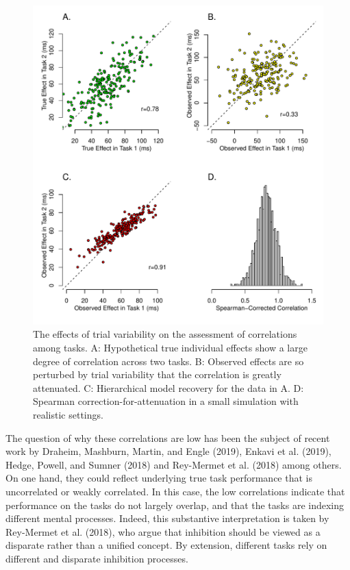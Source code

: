 \documentclass[
  ,man]{apa6}
\begin{document}
\begin{figure}
\centering
\includegraphics{p_files/figure-latex/example-1.pdf}
\caption{\label{fig:example}The effects of trial variability on the assessment of correlations among tasks. A: Hypothetical true individual effects show a large degree of correlation across two tasks. B: Observed effects are so perturbed by trial variability that the correlation is greatly attenuated. C: Hierarchical model recovery for the data in A. D: Spearman correction-for-attenuation in a small simulation with realistic settings.}
\end{figure}

The question of why these correlations are low has been the subject of recent work by Draheim, Mashburn, Martin, and Engle (2019), Enkavi et al. (2019), Hedge, Powell, and Sumner (2018) and Rey-Mermet et al. (2018) among others. On one hand, they could reflect underlying true task performance that is uncorrelated or weakly correlated. In this case, the low correlations indicate that performance on the tasks do not largely overlap, and that the tasks are indexing different mental processes. Indeed, this substantive interpretation is taken by Rey-Mermet et al. (2018), who argue that inhibition should be viewed as a disparate rather than a unified concept. By extension, different tasks rely on different and disparate inhibition processes.
\end{document}
